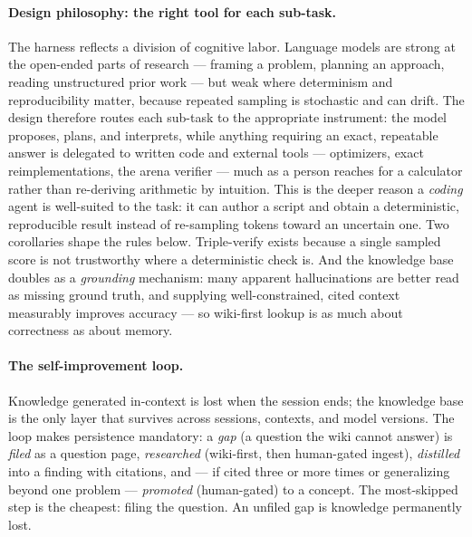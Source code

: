 \documentclass[11pt]{article}
\newcommand{\src}[1]{}
\begin{document}
\paragraph{Design philosophy: the right tool for each sub-task.}
The harness reflects a division of cognitive labor. Language models are strong at the
open-ended parts of research --- framing a problem, planning an approach, reading unstructured
prior work --- but weak where determinism and reproducibility matter, because repeated
sampling is stochastic and can drift. The design therefore routes each sub-task to the
appropriate instrument: the model proposes, plans, and interprets, while anything requiring an
exact, repeatable answer is delegated to written code and external tools --- optimizers, exact
reimplementations, the arena verifier --- much as a person reaches for a calculator rather than
re-deriving arithmetic by intuition. This is the deeper reason a \emph{coding} agent is
well-suited to the task: it can author a script and obtain a deterministic, reproducible result
instead of re-sampling tokens toward an uncertain one. Two corollaries shape the rules below.
Triple-verify exists because a single sampled score is not trustworthy where a deterministic
check is. And the knowledge base doubles as a \emph{grounding} mechanism: many apparent
hallucinations are better read as missing ground truth, and supplying well-constrained, cited
context measurably improves accuracy --- so wiki-first lookup is as much about correctness as
about memory.

\paragraph{The self-improvement loop.}
Knowledge generated in-context is lost when the session ends; the knowledge base is the only
layer that survives across sessions, contexts, and model versions. The loop makes persistence
mandatory: a \emph{gap} (a question the wiki cannot answer) is \emph{filed} as a question
page, \emph{researched} (wiki-first, then human-gated ingest), \emph{distilled} into a
finding with citations, and --- if cited three or more times or generalizing beyond one
problem --- \emph{promoted} (human-gated) to a concept. The most-skipped step is the
cheapest: filing the question. An unfiled gap is knowledge permanently lost.
\src{.claude/rules/self-improvement-loop.md}
\end{document}
